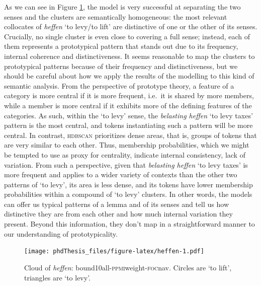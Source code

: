 \documentclass[
]{book}
\begin{document}
As we can see in Figure \ref{fig:heffen}, the model is very successful at separating the two senses and the clusters are semantically homogeneous: the most relevant collocates of \emph{heffen} `to levy/to lift' are distinctive of one or the other of its senses. Crucially, no single cluster is even close to covering a full sense; instead, each of them represents a prototypical pattern that stands out due to its frequency, internal coherence and distinctiveness.
It seems reasonable to map the clusters to prototypical patterns because of their frequency and distinctiveness, but we should be careful about how we apply the results of the modelling to this kind of semantic analysis. From the perspective of prototype theory, a feature of a category is more central if it is more frequent, i.e.~it is shared by more members, while a member is more central if it exhibits more of the defining features of the categories. As such, within the `to levy' sense, the \emph{belasting heffen} `to levy taxes' pattern is the most central, and tokens instantiating such a pattern will be more central. In contrast, \textsc{hdbscan} prioritizes dense areas, that is, groups of tokens that are very similar to each other. Thus, membership probabilities, which we might be tempted to use as proxy for centrality, indicate internal consistency, lack of variation. From such a perspective, given that \emph{belasting heffen} `to levy taxes' is more frequent and applies to a wider variety of contexts than the other two patterns of `to levy', its area is less dense, and its tokens have lower membership probabilities within a compound of `to levy' clusters.
In other words, the models can offer us typical patterns of a lemma and of its senses and tell us how distinctive they are from each other and how much internal variation they present. Beyond this information, they don't map in a straightforward manner to our understanding of prototypicality.



\begin{figure}
\centering
\texttt{[image: phdThesis\_files/figure-latex/heffen-1.pdf]}
\caption{\label{fig:heffen}Cloud of \emph{heffen}: bound10all-\textsc{ppmi}weight-\textsc{foc}nav. Circles are `to lift', triangles are `to levy'.}
\end{figure}
\end{document}
